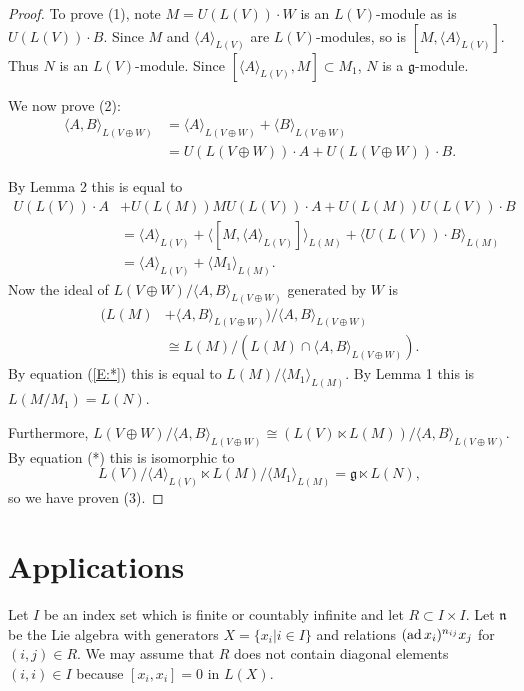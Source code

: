 \documentclass[11pt]{amsart}
\theoremstyle{definition}
\newcommand \ad{\text{ad}\thinspace}
\newcommand\la{\langle}
\newcommand\ra{\rangle}
\renewcommand{\frak}{\mathfrak}
\begin{document}
\begin{proof}
To prove (1), note $M= U(L(V))\cdot W$ is an $L(V)$-module as is
$U(L(V))\cdot B$. Since $M$ and $\la A\ra_{L(V)}$ are $L(V)$-modules,
so is $[M, \la A \ra_{L(V)}]$. Thus $N$ is an $L(V)$-module. Since
$[\la A\ra_{L(V)}, M] \subset M_1$, $N$ is a $\frak g$-module.

We now prove (2):
\begin{align*}
\la A, B\ra_{L(V \oplus W)} &= \la A \ra_{L(V \oplus W)} + \la B
\ra_{L(V\oplus W)} \\
&= U(L(V \oplus W))\cdot A + U(L(V \oplus W))\cdot B.
\end{align*}

By Lemma 2 this is equal to
\begin{align*}
U(L(V))\cdot A &+ U(L(M))MU(L(V))\cdot A + U(L(M))U(L(V))\cdot B \\
&= \la A \ra_{L(V)} + \la [ M, \la A \ra_{L(V)}] \ra_{L(M)}
  + \la U(L(V))\cdot B\ra_{L(M)}\\
&= \la A \ra_{L(V)} + \la M_1 \ra_{L(M)}.
\label{E:*}\tag{*}\end{align*} 
Now the ideal of $L(V \oplus W)/ \la A, B \ra_{L(V \oplus W)}$
generated by $W$ is 
\begin{align*}
(L(M) 
&+  \la A, B \ra_{L(V \oplus W)})/ \la A, B \ra_{L(V \oplus W)}\\
&\cong L(M)/(L(M) \cap  \la A, B \ra_{L(V \oplus W)}).
\end{align*}
By equation (\ref{E:*}) this is equal to
 $L(M)/ \la M_1 \ra_{L(M)}$. By
Lemma 1 this is $L(M/M_1) = L(N)$.

Furthermore, $L(V \oplus W) / \la A, B \ra_{L(V \oplus W)} \cong (L(V)
\ltimes L(M))/\la A, B \ra_{L(V \oplus W)}$. By equation (*) this is
isomorphic to 
$$L(V)/ \la A \ra_{L(V)} \ltimes  L(M)/ \la M_1 \ra_{L(M)}
= \frak g \ltimes L(N),$$
so we have proven (3).
\end{proof}

\section{Applications}

 Let $I$ be an index set  which is finite or countably infinite and
let $R \subset I \times I$. 
 Let $\frak n$ be the Lie algebra with generators $X= \{x_i | i\in I\}$
and relations
$(\ad x_i)^{n_{ij} }x_j$ for $(i,j)\in R$. We may assume that $R$ does
not contain  
diagonal elements $(i,i)\in I$ because $[x_i,x_i]=0 $ in $L(X)$.
\end{document}
